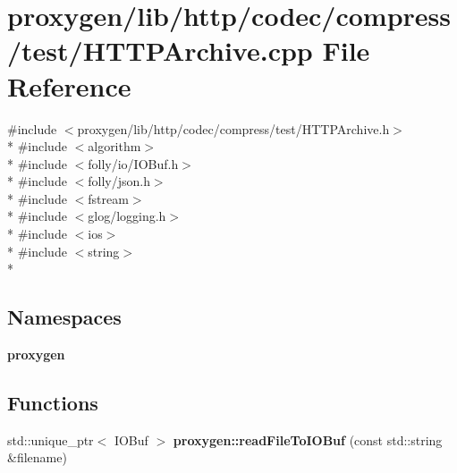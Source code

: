 \section{proxygen/lib/http/codec/compress/test/\+H\+T\+T\+P\+Archive.cpp File Reference}
\label{HTTPArchive_8cpp}
{\ttfamily \#include $<$proxygen/lib/http/codec/compress/test/\+H\+T\+T\+P\+Archive.\+h$>$}\\*
{\ttfamily \#include $<$algorithm$>$}\\*
{\ttfamily \#include $<$folly/io/\+I\+O\+Buf.\+h$>$}\\*
{\ttfamily \#include $<$folly/json.\+h$>$}\\*
{\ttfamily \#include $<$fstream$>$}\\*
{\ttfamily \#include $<$glog/logging.\+h$>$}\\*
{\ttfamily \#include $<$ios$>$}\\*
{\ttfamily \#include $<$string$>$}\\*
\subsection*{Namespaces}
\begin{DoxyCompactItemize}
\item 
 {\bf proxygen}
\end{DoxyCompactItemize}
\subsection*{Functions}
\begin{DoxyCompactItemize}
\item 
std\+::unique\+\_\+ptr$<$ I\+O\+Buf $>$ {\bf proxygen\+::read\+File\+To\+I\+O\+Buf} (const std\+::string \&filename)
\end{DoxyCompactItemize}
